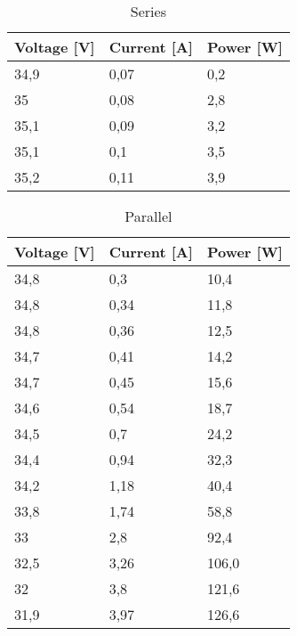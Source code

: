 \documentclass[12pt]{article}
\begin{document}
\begin{table}[!h]
	\centering
	\begin{tabular}{|p{2cm}|p{2cm}|p{2cm}|}
		\hline
		\rowcolor{Green!80} Voltage [V]  & Current [A] & Power [W] \\
		\hline
		\rowcolor{LimeGreen!70}    34,9  & 0,07        & 0,2       \\
		\hline
		\rowcolor{YellowGreen!70}   35   & 0,08        & 2,8       \\
		\hline
		\rowcolor{LimeGreen!70}    35,1  & 0,09        & 3,2       \\
		\hline
		\rowcolor{YellowGreen!70}   35,1 & 0,1         & 3,5       \\
		\hline
		\rowcolor{LimeGreen!70}     35,2 & 0,11        & 3,9       \\
		\hline
	\end{tabular}
	\caption{Series}
	\label{tab:my_label}
\end{table}

\begin{table}[!h]
	\centering
	\begin{tabular}{|p{2cm}|p{2cm}|p{2cm}|}
		\hline
		\rowcolor{RedOrange!80} Voltage [V] & Current [A] & Power [W] \\
		\hline
		\rowcolor{Peach!70}       34,8      & 0,3         & 10,4      \\
		\hline
		\rowcolor{Melon!70}        34,8     & 0,34        & 11,8      \\
		\hline
		\rowcolor{Peach!70}         34,8    & 0,36        & 12,5      \\
		\hline
		\rowcolor{Melon!70}        34,7     & 0,41        & 14,2      \\
		\hline
		\rowcolor{Peach!70}        34,7     & 0,45        & 15,6      \\
		\hline
		\rowcolor{Melon!70}          34,6   & 0,54        & 18,7      \\
		\hline
		\rowcolor{Peach!70}         34,5    & 0,7         & 24,2      \\
		\hline
		\rowcolor{Melon!70}          34,4   & 0,94        & 32,3      \\
		\hline
		\rowcolor{Peach!70}           34,2  & 1,18        & 40,4      \\
		\hline
		\rowcolor{Melon!70}         33,8    & 1,74        & 58,8      \\
		\hline
		\rowcolor{Peach!70}           33    & 2,8         & 92,4      \\
		\hline
		\rowcolor{Melon!70}           32,5  & 3,26        & 106,0     \\
		\hline
		\rowcolor{Peach!70}           32    & 3,8         & 121,6     \\
		\hline
		\rowcolor{Melon!70}           31,9  & 3,97        & 126,6     \\
		\hline
	\end{tabular}
	\caption{Parallel}
	\label{tab:my_label}
\end{table}
\end{document}

